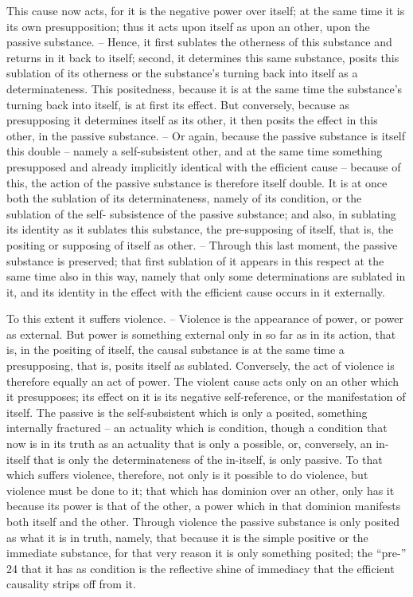 This cause now acts, for it is the negative power over itself; at the same
time it is its own presupposition; thus it acts upon itself as upon an other,
upon the passive substance. – Hence, it first sublates the otherness of this
substance and returns in it back to itself; second, it determines this same
substance, posits this sublation of its otherness or the substance’s turning
back into itself as a determinateness. This positedness, because it is at the
same time the substance’s turning back into itself, is at first its effect.
But conversely, because as presupposing it determines itself as its other, it
then posits the effect in this other, in the passive substance. – Or again,
because the passive substance is itself this double – namely a self-subsistent
other, and at the same time something presupposed and already implicitly
identical with the efficient cause – because of this, the action of the passive
substance is therefore itself double. It is at once both the sublation of
its determinateness, namely of its condition, or the sublation of the self-
subsistence of the passive substance; and also, in sublating its identity as
it sublates this substance, the pre-supposing of itself, that is, the positing
or supposing of itself as other. – Through this last moment, the passive
substance is preserved; that first sublation of it appears in this respect at
the same time also in this way, namely that only some determinations are
sublated in it, and its identity in the effect with the efficient cause occurs
in it externally.

To this extent it suffers violence. – Violence is the appearance of power,
or power as external. But power is something external only in so far as in its
action, that is, in the positing of itself, the causal substance is at the same
time a presupposing, that is, posits itself as sublated. Conversely, the act of
violence is therefore equally an act of power. The violent cause acts only on
an other which it presupposes; its effect on it is its negative self-reference,
or the manifestation of itself. The passive is the self-subsistent which is only
a posited, something internally fractured – an actuality which is condition,
though a condition that now is in its truth as an actuality that is only a
possible, or, conversely, an in-itself that is only the determinateness of the
in-itself, is only passive. To that which suffers violence, therefore, not only
is it possible to do violence, but violence must be done to it; that which
has dominion over an other, only has it because its power is that of the
other, a power which in that dominion manifests both itself and the other.
Through violence the passive substance is only posited as what it is in truth,
namely, that because it is the simple positive or the immediate substance,
for that very reason it is only something posited; the “pre-” 24 that it has as
condition is the reflective shine of immediacy that the efficient causality
strips off from it.

